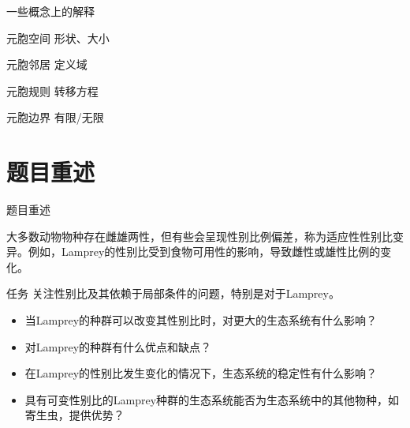 \documentclass{beamer}
\begin{document}
\begin{frame}{一些概念上的解释}

\begin{block}{元胞空间}
    形状、大小
\end{block}

\begin{block}{元胞邻居}
    定义域
\end{block}

\begin{block}{元胞规则}
    转移方程
\end{block}

\begin{block}{元胞边界}
    有限/无限
\end{block}
\end{frame}


\section{题目重述}
\begin{frame}{题目重述}

大多数动物物种存在雌雄两性，但有些会呈现性别比例偏差，称为适应性性别比变异。例如，Lamprey的性别比受到食物可用性的影响，导致雌性或雄性比例的变化。

\begin{block}{任务}
    关注性别比及其依赖于局部条件的问题，特别是对于Lamprey。
    \begin{itemize}
        \item 当Lamprey的种群可以改变其性别比时，对更大的生态系统有什么影响？
        \item 对Lamprey的种群有什么优点和缺点？
        \item 在Lamprey的性别比发生变化的情况下，生态系统的稳定性有什么影响？
        \item 具有可变性别比的Lamprey种群的生态系统能否为生态系统中的其他物种，如寄生虫，提供优势？
    \end{itemize}
\end{block}

\end{frame}
\end{document}
